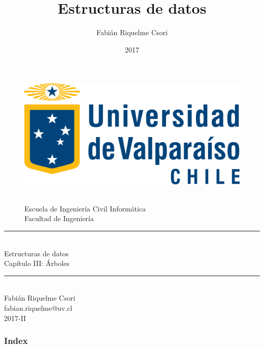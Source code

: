 \documentclass[handout]{beamer} %
\title{Estructuras de datos}   %
\author{Fabián Riquelme Csori} %
\date{2017}                    %
\institute{Universidad de Valparaíso}                 %
\newcommand{\HRule}{\rule{\linewidth}{0.2mm}\\[1ex]}
\begin{document}
%

\begin{frame}[plain]
  \begin{figure}[h]
    \begin{minipage}{0.3\textwidth}
    \includegraphics[width=.9\textwidth]{./image/logo-UV.png}
    \end{minipage}
    \begin{minipage}{0.65\textwidth}
     $~$\\[3.6ex]
     \footnotesize{Escuela de Ingeniería Civil Informática}\\
     \footnotesize{Facultad de Ingeniería}
    \end{minipage}
  \end{figure}
  \begin{center}
    \vspace{1ex}
    \HRule
    \Large{Estructuras de datos}\\{\small Capítulo III: Árboles}\\[-1ex]
    \HRule\vspace{1ex}
    \large{Fabián Riquelme Csori}\\[.5ex]\footnotesize{fabian.riquelme@uv.cl}\\[6ex] {\tiny 2017-II}\\[6ex]
  \end{center}
\end{frame}

\begin{frame}
 \frametitle{Index}
 \scriptsize 			%
 \tableofcontents		%
\end{frame}
\end{document}
